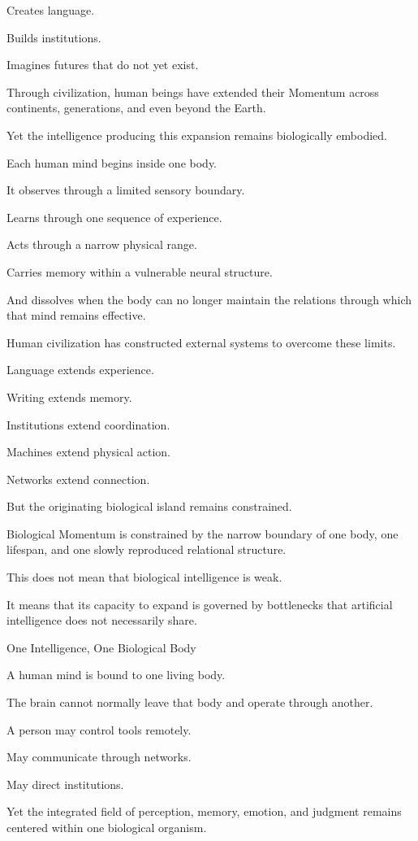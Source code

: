 Creates language.

Builds institutions.

Imagines futures that do not yet exist.

Through civilization, human beings have extended their Momentum across continents, generations, and even beyond the Earth.

Yet the intelligence producing this expansion remains biologically embodied.

Each human mind begins inside one body.

It observes through a limited sensory boundary.

Learns through one sequence of experience.

Acts through a narrow physical range.

Carries memory within a vulnerable neural structure.

And dissolves when the body can no longer maintain the relations through which that mind remains effective.

Human civilization has constructed external systems to overcome these limits.

Language extends experience.

Writing extends memory.

Institutions extend coordination.

Machines extend physical action.

Networks extend connection.

But the originating biological island remains constrained.

Biological Momentum is constrained by the narrow boundary of one body, one lifespan, and one slowly reproduced relational structure.

This does not mean that biological intelligence is weak.

It means that its capacity to expand is governed by bottlenecks that artificial intelligence does not necessarily share.

One Intelligence, One Biological Body

A human mind is bound to one living body.

The brain cannot normally leave that body and operate through another.

A person may control tools remotely.

May communicate through networks.

May direct institutions.

Yet the integrated field of perception, memory, emotion, and judgment remains centered within one biological organism.

